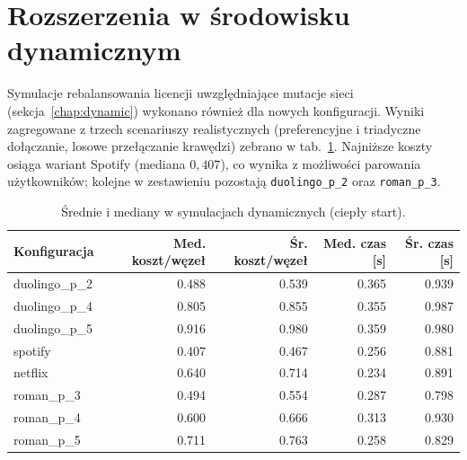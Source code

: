 \section{Rozszerzenia w środowisku dynamicznym}

Symulacje rebalansowania licencji uwzględniające mutacje sieci (sekcja~\ref{chap:dynamic}) wykonano również dla nowych konfiguracji. Wyniki zagregowane z trzech scenariuszy realistycznych (preferencyjne i triadyczne dołączanie, losowe przełączanie krawędzi) zebrano w tab.~\ref{tab:ext-dyn-overall}. Najniższe koszty osiąga wariant Spotify (mediana $0{,}407$), co wynika z możliwości parowania użytkowników; kolejne w zestawieniu pozostają \texttt{duolingo\_p\_2} oraz \texttt{roman\_p\_3}.

\begin{table}[H]
  \centering
  \caption{Średnie i mediany w symulacjach dynamicznych (ciepły start).}
  \label{tab:ext-dyn-overall}
  \begin{tabular}{lrrrr}
    \toprule
    \textbf{Konfiguracja} & \textbf{Med. koszt/węzeł} & \textbf{Śr. koszt/węzeł} & \textbf{Med. czas [s]} & \textbf{Śr. czas [s]} \\
    \midrule
    duolingo\_p\_2        & 0.488                     & 0.539                    & 0.365                  & 0.939                 \\
    duolingo\_p\_4        & 0.805                     & 0.855                    & 0.355                  & 0.987                 \\
    duolingo\_p\_5        & 0.916                     & 0.980                    & 0.359                  & 0.980                 \\
    spotify               & 0.407                     & 0.467                    & 0.256                  & 0.881                 \\
    netflix               & 0.640                     & 0.714                    & 0.234                  & 0.891                 \\
    roman\_p\_3           & 0.494                     & 0.554                    & 0.287                  & 0.798                 \\
    roman\_p\_4           & 0.600                     & 0.666                    & 0.313                  & 0.930                 \\
    roman\_p\_5           & 0.711                     & 0.763                    & 0.258                  & 0.829                 \\
  \end{tabular}
\end{table}

